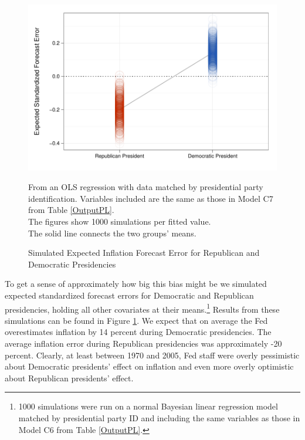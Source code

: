 \documentclass[a4paper]{article}\usepackage{graphicx, color}
\newenvironment{knitrout}{}{} %
\begin{document}
\begin{figure}[t]
    \caption{Simulated Expected Inflation Forecast Error for Republican and Democratic Presidencies}
    \label{ExpectValueParty}
    \begin{center}

\begin{knitrout}
\color{fgcolor}\includegraphics[width=0.7\linewidth]{figure/ExpectValueParty} 
\end{knitrout}

    \end{center}
    \begin{singlespace}
        {\scriptsize{From an OLS regression with data matched by presidential party identification. Variables included are the same as those in Model C7 from Table \ref{OutputPL}. \\ The figures show 1000 simulations per fitted value. \\ The solid line connects the two groups' means.}}
    \end{singlespace}
\end{figure}

To get a sense of approximately how big this bias might be we simulated expected standardized forecast errors for Democratic and Republican presidencies, holding all other covariates at their means.\footnote{1000 simulations were run on a normal Bayesian linear regression model matched by presidential party ID and including the same variables as those in Model C6 from Table \ref{OutputPL}.} Results from these simulations can be found in Figure \ref{ExpectValueParty}. We expect that on average the Fed overestimates inflation by 14 percent during Democratic presidencies. The average inflation error during Republican presidencies was approximately -20 percent. Clearly, at least between 1970 and 2005, Fed staff were overly pessimistic about Democratic presidents' effect on inflation and even more overly optimistic about Republican presidents' effect. 
\end{document}
